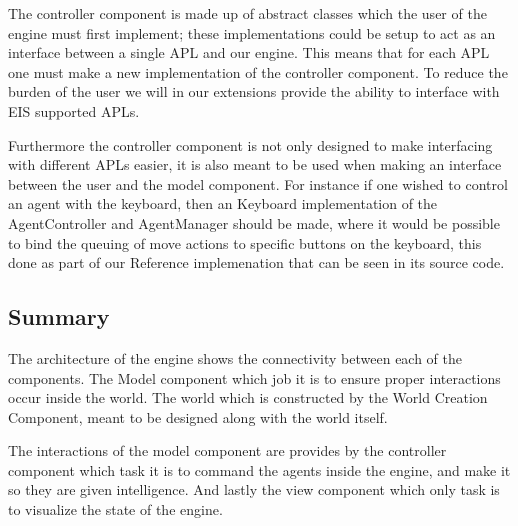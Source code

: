 The controller component is made up of abstract classes which the
user of the engine must first implement; these implementations could
be setup to act as an interface between a single APL and our engine.
This means that for each APL one must make a new implementation of
the controller component. To reduce the burden of the user we will
in our extensions provide the ability to interface with EIS supported
APLs.

Furthermore the controller component is not only designed to make
interfacing with different APLs easier, it is also meant to be used
when making an interface between the user and the model component.
For instance if one wished to control an agent with the keyboard,
then an Keyboard implementation of the AgentController and AgentManager
should be made, where it would be possible to bind the queuing of
move actions to specific buttons on the keyboard, this done as part
of our Reference implemenation that can be seen in its source code. 


\subsection*{Summary}

The architecture of the engine shows the connectivity between each
of the components. The Model component which job it is to ensure proper
interactions occur inside the world. The world which is constructed
by the World Creation Component, meant to be designed along with the
world itself. 

The interactions of the model component are provides by the controller
component which task it is to command the agents inside the engine,
and make it so they are given intelligence. And lastly the view component
which only task is to visualize the state of the engine.
